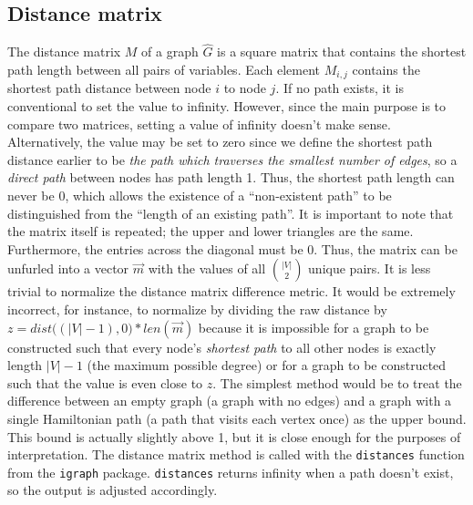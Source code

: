 \subsection{Distance matrix}

The distance matrix $M$ of a graph $\hat{G}$ is a square matrix that 
contains the shortest path length 
between all pairs of variables. Each element $M_{i,j}$ 
contains the shortest path distance between node $i$ to node $j$. If no path 
exists, it is conventional to set the value to infinity. However, since the 
main purpose is to compare two matrices, setting a value of infinity doesn't 
make sense. Alternatively, the value may be set to zero since we define the 
shortest path distance earlier to be \textit{the path which traverses the 
smallest number of edges}, so a \textit{direct path} between nodes has path 
length 1. Thus, the shortest path length can never be 0, which allows the 
existence of a ``non-existent path'' to be distinguished from the ``length of 
an existing path''. It is important to note that the matrix itself is repeated; 
the upper and lower triangles are the same. Furthermore, the entries across the 
diagonal must be 0. Thus, the matrix can be unfurled into a vector 
$\overrightarrow{m}$ with the values of all $\binom{|V|}{2}$ unique pairs.
It is less trivial to normalize the distance matrix difference metric. It would 
be extremely incorrect, for instance, to normalize by dividing the raw distance 
by $z = dist\big((|V|-1),0\big) * len(\overrightarrow{m})$ because it is 
impossible for a graph to be constructed such that every node's 
\textit{shortest path} to all other nodes is exactly length $|V|-1$ (the 
maximum possible degree) or for a graph to be constructed such that the value 
is even close to $z$. 
The simplest method would be to treat the difference between an empty graph (a 
graph with no edges) and a graph with a single Hamiltonian path (a path that 
visits each vertex once) as the upper bound. This bound is actually slightly 
above 1, but it is close enough for the purposes of interpretation. 
The distance matrix method is called with the \texttt{distances} function from 
the \texttt{igraph} package. \texttt{distances} returns infinity when a path 
doesn't exist, so the output is adjusted accordingly.

